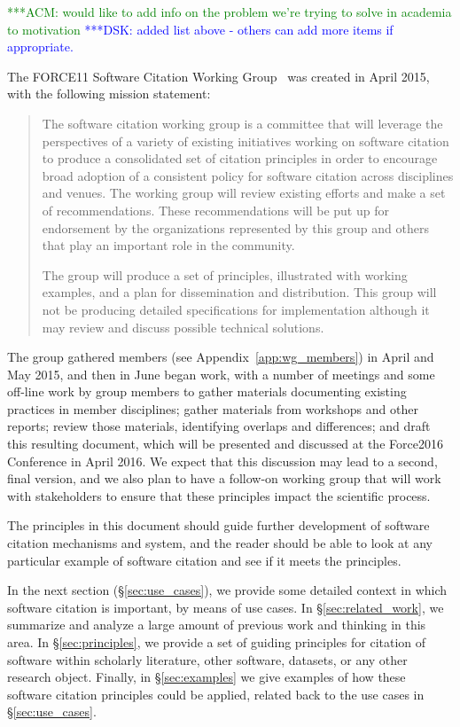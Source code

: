 \documentclass[11pt, oneside]{amsart}
\newcommand{\katznote}[1]{ {\textcolor{blue} { ***DSK: #1 }}}
\newcommand{\acmnote}[1]{ {\textcolor{green} { ***ACM: #1 }}} %
\begin{document}
\acmnote{would like to add info on the problem we're trying to solve in academia to motivation} 
\katznote{added list above - others can add more items if appropriate.}


The FORCE11 Software Citation Working Group~\cite{f11scwg} was created in April 2015, with the following mission statement:

\begin{quote}
The software citation working group is a committee that will leverage the perspectives of a variety of existing initiatives working on software citation to produce a consolidated set of citation principles in order to encourage broad adoption of a consistent policy for software citation across disciplines and venues. The working group will review existing efforts and make a set of recommendations. These recommendations will be put up for endorsement by the organizations represented by this group and others that play an important role in the community.

The group will produce a set of principles, illustrated with working examples, and a plan for dissemination and distribution. This group will not be producing detailed specifications for implementation although it may review and discuss possible technical solutions.\end{quote}

The group gathered members (see Appendix~\ref{app:wg_members}) in April and May 2015, and then in June began work, with a number of meetings
and some off-line work by group members to gather materials documenting existing
practices in member disciplines; gather materials from workshops and other reports;
review those materials, identifying overlaps and differences; and draft this resulting document,
which will be presented and discussed at the Force2016 Conference \cite{force2016}
in April 2016.  We expect that
this discussion may lead to a second, final version, and we also
plan to have a follow-on working group that will work with stakeholders to ensure that
these principles impact the scientific process.

The principles in this document should guide further development of software citation mechanisms and system, and the reader should be able to look at any particular example of software citation and see if it meets the principles.

In the next section (\S\ref{sec:use_cases}), we provide some detailed context in which
software citation is important, by means of use cases.  In \S\ref{sec:related_work}, we
summarize and analyze a large amount of previous work and thinking in this area.  In
\S\ref{sec:principles}, we provide a set of guiding principles for citation of software within
scholarly literature, other software, datasets, or any other research object.  Finally,
in \S\ref{sec:examples} we give examples of how these software citation principles
could be applied, related back to the use cases in \S\ref{sec:use_cases}.
\end{document}
